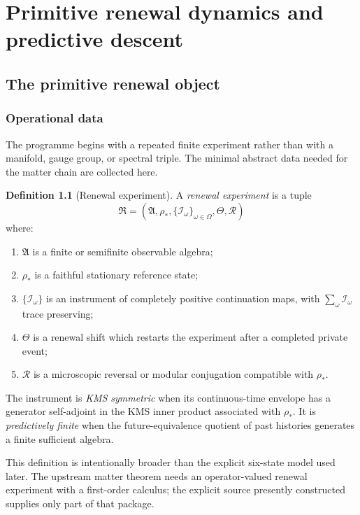 \documentclass[11pt,oneside,openany]{book}
\numberwithin{equation}{chapter}
\theoremstyle{definition}
\newtheorem{definition}[theorem]{Definition}
\theoremstyle{remark}
\begin{document}
\mainmatter

\part{Primitive renewal dynamics and predictive descent}

\chapter{The primitive renewal object}
\label{ch:primitive}

\section{Operational data}
The programme begins with a repeated finite experiment rather than with a manifold, gauge group, or spectral triple.  The minimal abstract data needed for the matter chain are collected here.

\begin{definition}[Renewal experiment]
\label{def:renewal-experiment}
A \emph{renewal experiment} is a tuple
\[
 \mathfrak R=(\mathfrak A,\rho_*,\{\mathcal I_\omega\}_{\omega\in\Omega},\Theta,\mathscr R)
\]
where:
\begin{enumerate}[label=\textup{(R\arabic*)},leftmargin=2.8em]
\item $\mathfrak A$ is a finite or semifinite observable algebra;
\item $\rho_*$ is a faithful stationary reference state;
\item $\{\mathcal I_\omega\}$ is an instrument of completely positive continuation maps, with $\sum_\omega\mathcal I_\omega$ trace preserving;
\item $\Theta$ is a renewal shift which restarts the experiment after a completed private event;
\item $\mathscr R$ is a microscopic reversal or modular conjugation compatible with $\rho_*$.
\end{enumerate}
The instrument is \emph{KMS symmetric} when its continuous-time envelope has a generator self-adjoint in the KMS inner product associated with $\rho_*$.  It is \emph{predictively finite} when the future-equivalence quotient of past histories generates a finite sufficient algebra.
\end{definition}

This definition is intentionally broader than the explicit six-state model used later.  The upstream matter theorem needs an operator-valued renewal experiment with a first-order calculus; the explicit source presently constructed supplies only part of that package.
\end{document}
